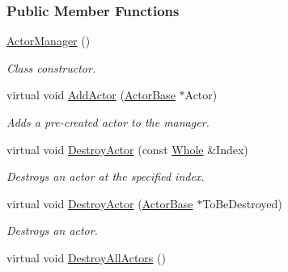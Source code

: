 \subsubsection*{Public Member Functions}
\begin{DoxyCompactItemize}
\item 
\hypertarget{classMezzanine_1_1ActorManager_aa9074e3c8dd87865e957c4d76fbc5e25}{
\hyperlink{classMezzanine_1_1ActorManager_aa9074e3c8dd87865e957c4d76fbc5e25}{ActorManager} ()}
\label{classMezzanine_1_1ActorManager_aa9074e3c8dd87865e957c4d76fbc5e25}

\begin{DoxyCompactList}\small\item\em Class constructor. \item\end{DoxyCompactList}\item 
virtual void \hyperlink{classMezzanine_1_1ActorManager_af801d07590853b3ae0c52574a340ea44}{AddActor} (\hyperlink{classMezzanine_1_1ActorBase}{ActorBase} $\ast$Actor)
\begin{DoxyCompactList}\small\item\em Adds a pre-\/created actor to the manager. \item\end{DoxyCompactList}\item 
virtual void \hyperlink{classMezzanine_1_1ActorManager_a5e4daba372199d0d140fd590a4d0f501}{DestroyActor} (const \hyperlink{namespaceMezzanine_adcbb6ce6d1eb4379d109e51171e2e493}{Whole} \&Index)
\begin{DoxyCompactList}\small\item\em Destroys an actor at the specified index. \item\end{DoxyCompactList}\item 
virtual void \hyperlink{classMezzanine_1_1ActorManager_a39d628c0ee0eaa225df741835f1061e7}{DestroyActor} (\hyperlink{classMezzanine_1_1ActorBase}{ActorBase} $\ast$ToBeDestroyed)
\begin{DoxyCompactList}\small\item\em Destroys an actor. \item\end{DoxyCompactList}\item 
\hypertarget{classMezzanine_1_1ActorManager_ac71886ad26a513d1b53f0e2d6049539c}{
virtual void \hyperlink{classMezzanine_1_1ActorManager_ac71886ad26a513d1b53f0e2d6049539c}{DestroyAllActors} ()}
\label{classMezzanine_1_1ActorManager_ac71886ad26a513d1b53f0e2d6049539c}


\end{DoxyCompactItemize}
